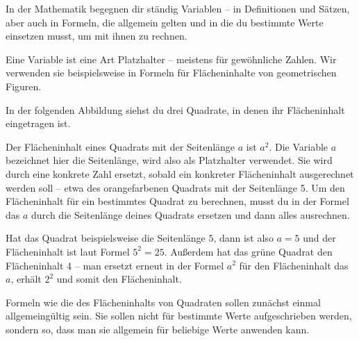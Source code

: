 \documentclass[../../main.tex]{subfiles}
\begin{document}
In der Mathematik begegnen dir ständig Variablen -- in Definitionen und Sätzen, aber auch in Formeln, die allgemein gelten und in die du bestimmte Werte einsetzen musst, um mit ihnen zu rechnen.

Eine Variable ist eine Art Platzhalter -- meistens für gewöhnliche Zahlen. Wir verwenden sie beispielsweise in Formeln für Flächeninhalte von geometrischen Figuren. 

\begin{example}{}
    In der folgenden Abbildung siehst du drei Quadrate, in denen ihr Flächeninhalt eingetragen ist.
    
        
    Der Flächeninhalt eines Quadrats mit der Seitenlänge $a$ ist $a^2$. Die Variable $a$ bezeichnet hier die Seitenlänge, wird also als Platzhalter verwendet. Sie wird durch eine konkrete Zahl ersetzt, sobald ein konkreter Flächeninhalt ausgerechnet werden soll -- etwa des orangefarbenen Quadrats mit der Seitenlänge 5. Um den Flächeninhalt für ein bestimmtes Quadrat zu berechnen, musst du in der Formel das $a$ durch die Seitenlänge deines Quadrats ersetzen und dann alles ausrechnen.
    
    Hat das Quadrat beispielsweise die Seitenlänge $5$, dann ist also $a=5$ und der Flächeninhalt ist laut Formel $5^2=25$. Außerdem hat das grüne Quadrat den Flächeninhalt 4 -- man ersetzt erneut in der Formel $a^2$ für den Flächeninhalt das $a$, erhält $2^2$ und somit den Flächeninhalt.
\end{example}

Formeln wie die des Flächeninhalts von Quadraten sollen zunächst einmal allgemeingültig sein. Sie sollen nicht für bestimmte Werte aufgeschrieben werden, sondern so, dass man sie allgemein für beliebige Werte anwenden kann.
\end{document}
